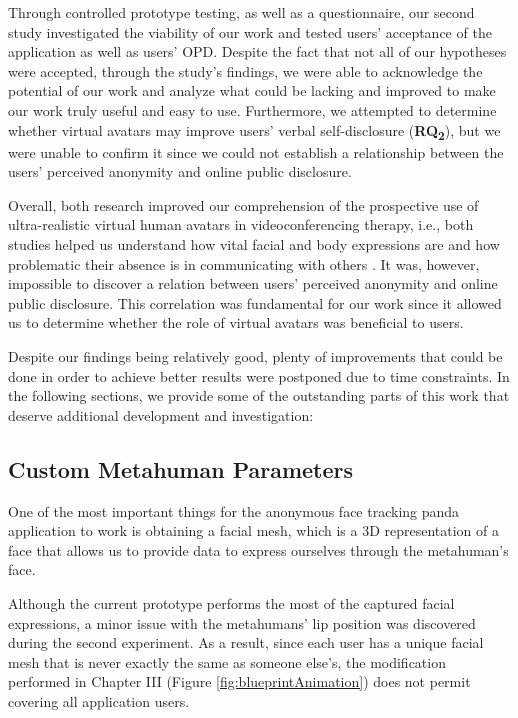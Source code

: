Through controlled prototype testing, as well as a questionnaire, our second study investigated the viability of our work and tested users' acceptance of the application as well as users' OPD. Despite the fact that not all of our hypotheses were accepted, through the study's findings, we were able to acknowledge the potential of our work and analyze what could be lacking and improved to make our work truly useful and easy to use. Furthermore, we attempted to determine whether virtual avatars may improve users' verbal self-disclosure (\textbf{RQ\textsubscript{2}}), but we were unable to confirm it since we could not establish a relationship between the users' perceived anonymity and online public disclosure.

Overall, both research improved our comprehension of the prospective use of ultra-realistic virtual human avatars in videoconferencing therapy, i.e., both studies helped us understand how vital facial and body expressions are and how problematic their absence is in communicating with others \cite{KNA13}. It was, however, impossible to discover a relation between users' perceived anonymity and online public disclosure. This correlation was fundamental for our work since it allowed us to determine whether the role of virtual avatars was beneficial to users.

Despite our findings being relatively good, plenty of improvements that could be done in order to achieve better results were postponed due to time constraints. In the following sections, we provide some of the outstanding parts of this work that deserve additional development and investigation:

\subsection{Custom Metahuman Parameters}
One of the most important things for the anonymous face tracking panda application to work is obtaining a facial mesh, which is a 3D representation of a face that allows us to provide data to express ourselves through the metahuman's face. 

Although the current prototype performs the most of the captured facial expressions, a minor issue with the metahumans' lip position was discovered during the second experiment. As a result, since each user has a unique facial mesh that is never exactly the same as someone else's, the modification performed in Chapter III (Figure \ref{fig:blueprintAnimation}) does not permit covering all application users. 

